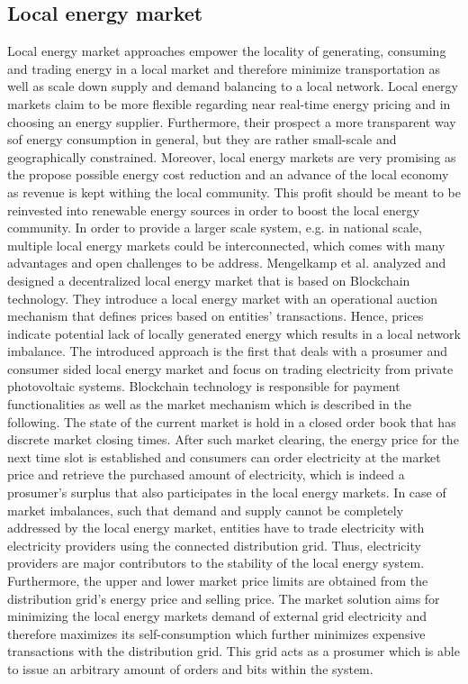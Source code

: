 \documentclass[runningheads]{llncs}
\begin{document}
\subsection{Local energy market}
Local energy market approaches empower the locality of generating, consuming and trading energy in a local market and therefore minimize transportation as well as scale down supply and demand balancing to a local network. Local energy markets claim to be more flexible regarding near real-time energy pricing and in choosing an energy supplier. Furthermore, their prospect a more transparent way sof energy consumption in general, but they are rather small-scale and geographically constrained. Moreover, local energy markets are very promising as the propose possible energy cost reduction and an advance of the local economy as revenue is kept withing the local community. This profit should be meant to be reinvested into renewable energy sources in order to boost the local energy community.\cite{mengelkamp_lem} \newline
In order to provide a larger scale system, e.g. in national scale, multiple local energy markets could be interconnected, which comes with many advantages and open challenges to be address. Mengelkamp et al. \cite{mengelkamp_lem} analyzed and designed a decentralized local energy market that is based on Blockchain technology. They introduce a local energy market with an operational auction mechanism that defines prices based on entities’ transactions. Hence, prices indicate potential lack of locally generated energy which results in a local network imbalance.
The introduced approach is the first that deals with a prosumer and consumer sided local energy market and focus on trading electricity from private photovoltaic systems.
Blockchain technology is responsible for payment functionalities as well as the market mechanism which is described in the following. \newline
The state of the current market is hold in a closed order book that has discrete market closing times. After such market clearing, the energy price for the next time slot is established and consumers can order electricity at the market price and retrieve the purchased amount of electricity, which is indeed a prosumer’s surplus that also participates in the local energy markets. In case of market imbalances, such that demand and supply cannot be completely addressed by the local energy market, entities have to trade electricity with electricity providers using the connected distribution grid. Thus, electricity providers are major contributors to the stability of the local energy system. Furthermore, the upper and lower market price limits are obtained from the distribution grid’s energy price and selling price. The market solution aims for minimizing the local energy markets demand of external grid electricity and therefore maximizes its self-consumption which further minimizes expensive transactions with the distribution grid. This grid acts as a prosumer which is able to issue an arbitrary amount of orders and bits within the system. 
\end{document}
